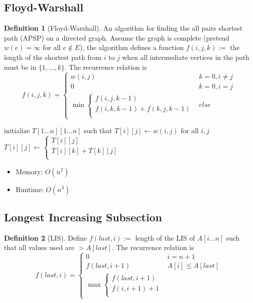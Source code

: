 \documentclass[11pt]{article}
\theoremstyle{definition}
\newtheorem{definition}{Definition}[section]
\theoremstyle{remark}
\begin{document}
\subsection{Floyd-Warshall}
\begin{definition}[Floyd-Warshall]
An algorithm for finding the all pairs shortest path (APSP) on a directed graph. Assume the graph is complete (pretend $w(e)=\infty$ for all $e \not\in E$), the algorithm defines a function $f(i,j,k) :=$ the length of the shortest path from $i$ to $j$ when all intermediate vertices in the path must be in $\{1,\dots,k\}$.  The recurrence relation is
\[
f(i,j,k) = \begin{cases}
w(i,j) & k=0, i \neq j \\
0 & k=0, i = j \\
\min\begin{cases}
f(i,j,k-1) \\
f(i,k,k-1) + f(k,j,k-1) \\
\end{cases} & else
\end{cases}
\]
\end{definition}

\begin{algorithm}
    \caption{Floyd-Warshall}
    
    \DontPrintSemicolon
    
    initialize $T[1\dots n][1\dots n]$ such that $T[i][j]\gets w(i,j)$ for all $i,j$ \\
     {
    	 {
    		 {
    			$T[i][j] \gets \begin{cases}
    			T[i][j] \\
    			T[i][k] + T[k][j] \\
    			\end{cases}
    			$
    		}
    	}
    } 
\end{algorithm}

\begin{itemize}
\item Memory: $O(n^2)$
\item Runtime: $O(n^3)$
\end{itemize}

\subsection{Longest Increasing Subsection}
\begin{definition}[LIS]
Define $f(last, i) :=$ length of the LIS of $A[i \dots n]$ such that all values used are $> A[last]$. The recurrence relation is
\[
f(last, i) = \begin{cases}
0 & i = n+1 \\
f(last, i+1) & A[i] \leq A[last] \\
\max \begin{cases}
f(last, i+1) \\
f(i, i+1) + 1 \\
\end{cases}
\end{cases}
\]
\end{definition}
\end{document}
